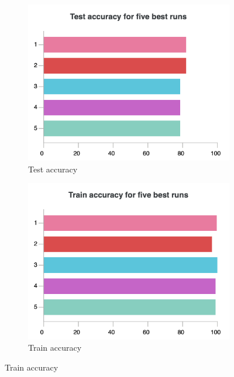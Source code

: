 	\begin{figure}[hbtp]
		\begin{subfigure}{0.49\textwidth}
			\centering
			\includegraphics[width=\linewidth]{fig/results/wandb/spaghetti_dataset/charts/Section-2-Panel-2-od5lt0wga}
			\caption{Test accuracy}
			\label{fig:res:sd:ta}
		\end{subfigure}
		\hspace*{\fill}
		\begin{subfigure}{0.49\textwidth}
			\centering
			\includegraphics[width=\linewidth]{fig/results/wandb/spaghetti_dataset/charts/Section-2-Panel-1-vxyqvv7et}
			\caption{Train accuracy}
			\label{fig:res:sd:tra}

\end{subfigure}
\end{figure}
